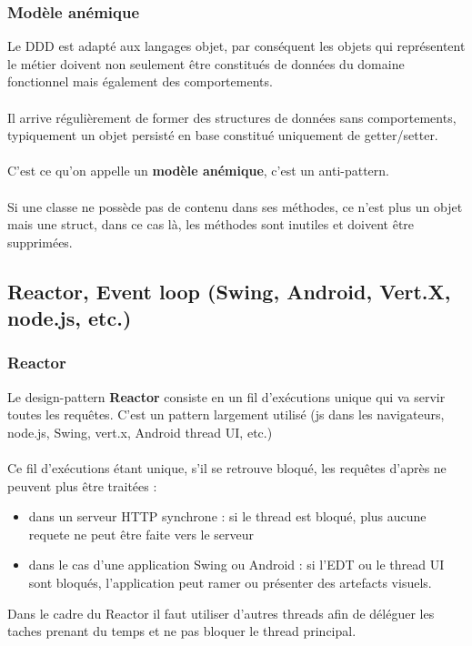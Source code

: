 \begin{frame}[fragile]
	\frametitle{Mod\`{e}le an\'{e}mique}
Le DDD est adapt\'{e} aux langages objet, par cons\'{e}quent les objets qui repr\'{e}sentent le m\'{e}tier doivent non seulement \^{e}tre constitu\'{e}s de donn\'{e}es du domaine fonctionnel mais \'{e}galement des comportements.
\\~\\
Il arrive r\'{e}guli\`{e}rement de former des structures de donn\'{e}es sans comportements, typiquement un objet persist\'{e} en base constitu\'{e} uniquement de getter/setter.
\\~\\
C'est ce qu'on appelle un \textbf{mod\`{e}le an\'{e}mique}, c'est un anti-pattern.
\\~\\
Si une classe ne poss\`{e}de pas de contenu dans ses m\'{e}thodes, ce n'est plus un objet mais une struct, dans ce cas l\`{a}, les m\'{e}thodes sont inutiles et doivent \^{e}tre supprim\'{e}es.
\end{frame}

\subsection{Reactor, Event loop (Swing, Android, Vert.X, node.js, etc.)}

\begin{frame}[fragile]
	\frametitle{Reactor}
Le design-pattern \textbf{Reactor} consiste en un fil d'ex\'{e}cutions unique qui va servir toutes les requ\^{e}tes. C'est un pattern largement utilis\'{e} (js dans les navigateurs, node.js, Swing, vert.x, Android thread UI, etc.)
\\~\\
Ce fil d'ex\'{e}cutions \'{e}tant unique, s'il se retrouve bloqu\'{e}, les requ\^{e}tes d'apr\`{e}s ne peuvent plus \^{e}tre trait\'{e}es : 
\begin{itemize}
\item dans un serveur HTTP synchrone : si le thread est bloqu\'{e}, plus aucune requete ne peut \^{e}tre faite vers le serveur
\item dans le cas d'une application Swing ou Android : si l'EDT ou le thread UI sont bloqu\'{e}s, l'application peut ramer ou pr\'{e}senter des artefacts visuels.
\end{itemize}
Dans le cadre du Reactor il faut utiliser d'autres threads afin de d\'{e}l\'{e}guer les taches prenant du temps et ne pas bloquer le thread principal.
\end{frame}

